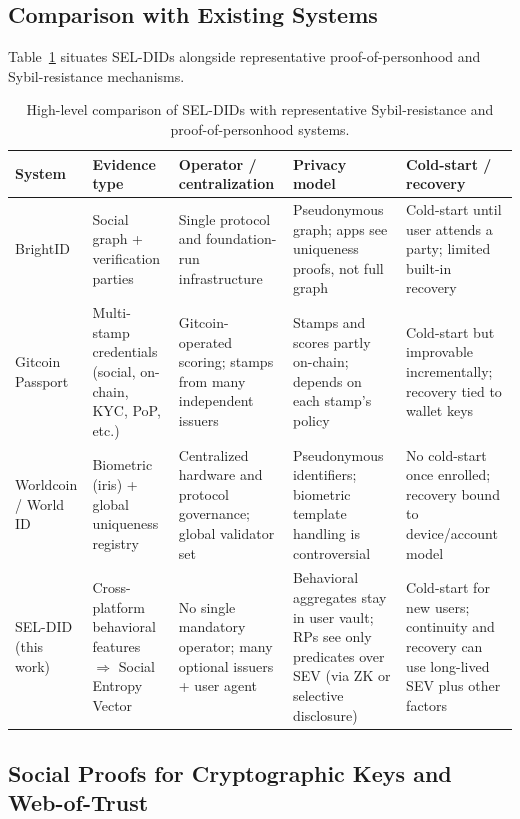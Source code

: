 \documentclass[11pt]{article}
\begin{document}
\subsection{Comparison with Existing Systems}

Table~\ref{tab:comparison} situates SEL-DIDs alongside representative proof-of-personhood and Sybil-resistance mechanisms.

\begin{table}[h]
  \centering
  \begin{tabular}{p{2.3cm} p{3cm} p{3cm} p{3cm} p{3cm}}
    \hline
    System &
    Evidence type &
    Operator / centralization &
    Privacy model &
    Cold-start / recovery \\
    \hline
    BrightID &
    Social graph + verification parties &
    Single protocol and foundation-run infrastructure &
    Pseudonymous graph; apps see uniqueness proofs, not full graph &
    Cold-start until user attends a party; limited built-in recovery \\
    \hline
    Gitcoin Passport &
    Multi-stamp credentials (social, on-chain, KYC, PoP, etc.) &
    Gitcoin-operated scoring; stamps from many independent issuers &
    Stamps and scores partly on-chain; depends on each stamp's policy &
    Cold-start but improvable incrementally; recovery tied to wallet keys \\
    \hline
    Worldcoin / World ID &
    Biometric (iris) + global uniqueness registry &
    Centralized hardware and protocol governance; global validator set &
    Pseudonymous identifiers; biometric template handling is controversial &
    No cold-start once enrolled; recovery bound to device/account model \\
    \hline
    SEL-DID (this work) &
    Cross-platform behavioral features $\Rightarrow$ Social Entropy Vector &
    No single mandatory operator; many optional issuers + user agent &
    Behavioral aggregates stay in user vault; RPs see only predicates over SEV (via ZK or selective disclosure) &
    Cold-start for new users; continuity and recovery can use long-lived SEV plus other factors \\
    \hline
  \end{tabular}
  \caption{High-level comparison of SEL-DIDs with representative Sybil-resistance and proof-of-personhood systems.}
  \label{tab:comparison}
\end{table}

\subsection{Social Proofs for Cryptographic Keys and Web-of-Trust}
\end{document}
